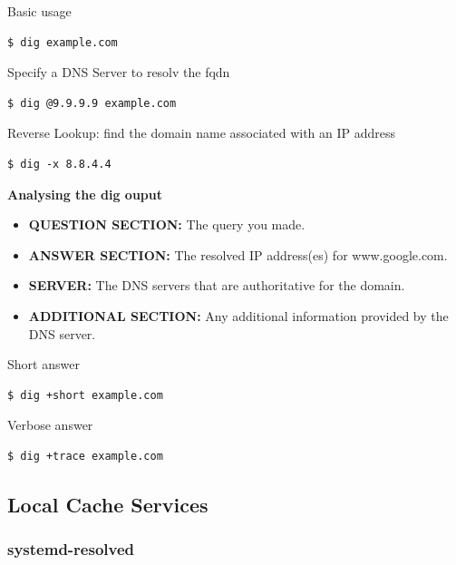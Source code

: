 \documentclass{article}
\newenvironment{codetemplate}[1][]{%
  \mybasecolorbox[#1]
  \itshape
}{%
  \endmybasecolorbox
}
\begin{document}
Basic usage
\begin{codetemplate}{}
\begin{verbatim}
$ dig example.com
\end{verbatim}
\end{codetemplate}

Specify a DNS Server to resolv the fqdn
\begin{codetemplate}{}
\begin{verbatim}
$ dig @9.9.9.9 example.com
\end{verbatim}
\end{codetemplate}

Reverse Lookup: find the domain name associated with an IP address
\begin{codetemplate}{}
\begin{verbatim}
$ dig -x 8.8.4.4
\end{verbatim}
\end{codetemplate}

\textbf{Analysing the dig ouput}
\begin{itemize}
    \item \textbf{QUESTION SECTION:} The query you made.
    \item \textbf{ANSWER SECTION:} The resolved IP address(es) for www.google.com.
    \item \textbf{SERVER:} The DNS servers that are authoritative for the domain.
    \item \textbf{ADDITIONAL SECTION:} Any additional information provided by the DNS server.
\end{itemize}

Short answer
\begin{codetemplate}{}
\begin{verbatim}
$ dig +short example.com
\end{verbatim}
\end{codetemplate}

Verbose answer
\begin{codetemplate}{}
\begin{verbatim}
$ dig +trace example.com
\end{verbatim}
\end{codetemplate}

\subsection{Local Cache Services}

\subsubsection{systemd-resolved}
\end{document}
